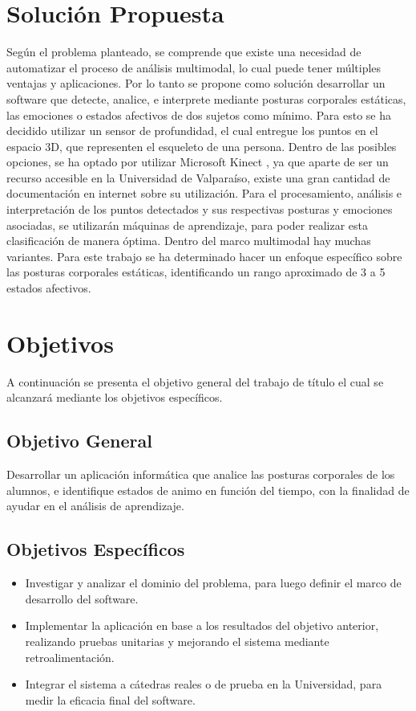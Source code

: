 \section{Solución Propuesta}
Según el problema planteado, se comprende que existe una necesidad de automatizar el proceso de análisis multimodal, lo cual puede tener múltiples ventajas y aplicaciones. Por lo tanto se propone como solución desarrollar un software que detecte, analice, e interprete mediante posturas corporales estáticas, las emociones o estados afectivos de dos sujetos como mínimo. 
Para esto se ha decidido utilizar un sensor de profundidad, el cual entregue los puntos en el espacio 3D, que representen el esqueleto de una persona. Dentro de las posibles opciones, se ha optado por utilizar Microsoft Kinect \cite{ref14}, ya que aparte de ser un recurso accesible en la Universidad de Valparaíso, existe una gran cantidad de documentación en internet sobre su utilización.
Para el procesamiento, análisis e interpretación de los puntos detectados y sus respectivas posturas y emociones asociadas, se utilizarán máquinas de aprendizaje, para poder realizar esta clasificación de manera óptima.
Dentro del marco multimodal hay muchas variantes. Para este trabajo se ha determinado hacer un enfoque específico sobre las posturas corporales estáticas, identificando un rango aproximado de 3 a 5 estados afectivos.


\section{Objetivos}
\label{obj}
A continuación se presenta el objetivo general del trabajo de título el cual se alcanzará mediante los objetivos específicos.

\subsection{Objetivo General}
Desarrollar un aplicación informática que analice las posturas corporales de los alumnos, e identifique estados de animo en función del tiempo, con la finalidad de ayudar en el análisis de aprendizaje.


\subsection{Objetivos Específicos}

\begin{itemize}
	\item Investigar y analizar el dominio del problema, para luego definir el marco de desarrollo del software.
	\item Implementar la aplicación en base a los resultados del objetivo anterior, realizando pruebas unitarias y mejorando el sistema mediante retroalimentación.
	\item Integrar el sistema a cátedras reales o de prueba en la Universidad, para medir la eficacia final del software.
\end{itemize}
